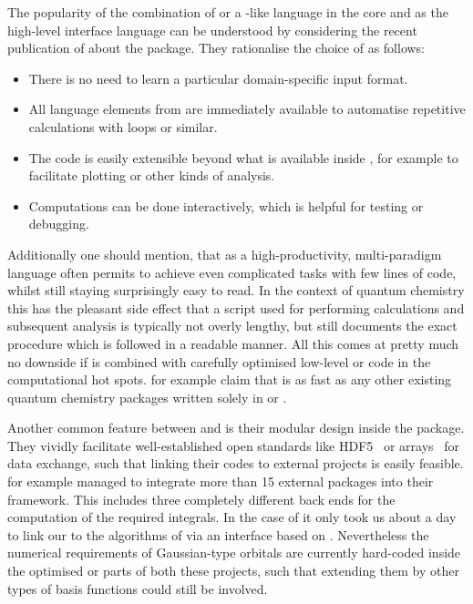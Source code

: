 The popularity of the combination of \fortran or a \ccc-like
language in the core and \python as the high-level interface language
can be understood by considering the recent publication of \citet{Sun2017}
about the \pyscf package.
They rationalise the choice of \python as follows:
\begin{itemize}
	\item There is no need to learn a particular domain-specific
		input format.
	\item All language elements from \python are immediately
		available to \eg automatise repetitive calculations
		with loops or similar.
	\item The code is easily extensible beyond what is available
		inside \pyscf, for example to facilitate plotting
		or other kinds of analysis.
	\item Computations can be done interactively,
		which is helpful for testing or debugging.
\end{itemize}
Additionally one should mention,
that \python as a high-productivity, multi-paradigm language
often permits to achieve even complicated tasks with few lines of code,
whilst still staying surprisingly easy to read.
In the context of quantum chemistry
this has the pleasant side effect that a \python script
used for performing calculations and subsequent analysis
is typically not overly lengthy,
but still documents the exact procedure which is followed in a readable manner.
All this comes at pretty much no downside
if \python is combined with
carefully optimised low-level \ccc or \fortran
code in the computational hot spots.
\citet{Sun2017} for example claim that \pyscf is as
fast as any other existing quantum chemistry packages
written solely in \ccc or \fortran.

Another common feature between \pyscf and \psifour
is their modular design inside the package.
They vividly facilitate well-established open standards
like HDF5~\cite{HDF5Manual} or \numpy arrays~\cite{Walt2011}
for data exchange,
such that linking their codes to external projects is easily feasible.
\psifour for example managed to integrate more than 15 external packages
into their framework.
This includes three completely different back ends for the computation of the
required integrals.
In the case of \pyscf it only took us about a day to link
our \molsturm to the \FCI algorithms of \pyscf
via an interface based on \numpy.
Nevertheless the numerical requirements of Gaussian-type orbitals
are currently hard-coded inside the optimised
\ccc or \cpp parts of both these projects,
such that extending them by other types of basis functions could still be involved.

